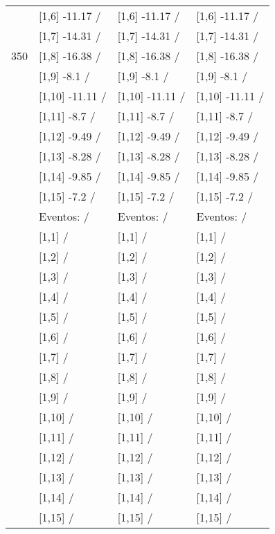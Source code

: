 \begin{table}
\begin{tabular}[t]{llll}
 & {}[1,6] -11.17  / & {}[1,6] -11.17  / & {}[1,6] -11.17  /\\
 & {}[1,7] -14.31  / & {}[1,7] -14.31  / & {}[1,7] -14.31  /\\
350 & {}[1,8] -16.38  / & {}[1,8] -16.38  / & {}[1,8] -16.38  /\\
\addlinespace
 & {}[1,9] -8.1  / & {}[1,9] -8.1  / & {}[1,9] -8.1  /\\
 & {}[1,10] -11.11  / & {}[1,10] -11.11  / & {}[1,10] -11.11  /\\
 & {}[1,11] -8.7  / & {}[1,11] -8.7  / & {}[1,11] -8.7  /\\
 & {}[1,12] -9.49  / & {}[1,12] -9.49  / & {}[1,12] -9.49  /\\
 & {}[1,13] -8.28  / & {}[1,13] -8.28  / & {}[1,13] -8.28  /\\
\addlinespace
 & {}[1,14] -9.85  / & {}[1,14] -9.85  / & {}[1,14] -9.85  /\\
 & {}[1,15] -7.2  / & {}[1,15] -7.2  / & {}[1,15] -7.2  /\\
 & Eventos:   / & Eventos:   / & Eventos:   /\\
 & {}[1,1]  / & {}[1,1]  / & {}[1,1]  /\\
 & {}[1,2]  / & {}[1,2]  / & {}[1,2]  /\\
\addlinespace
 & {}[1,3]  / & {}[1,3]  / & {}[1,3]  /\\
 & {}[1,4]  / & {}[1,4]  / & {}[1,4]  /\\
 & {}[1,5]  / & {}[1,5]  / & {}[1,5]  /\\
 & {}[1,6]  / & {}[1,6]  / & {}[1,6]  /\\
 & {}[1,7]  / & {}[1,7]  / & {}[1,7]  /\\
\addlinespace
500 & {}[1,8]  / & {}[1,8]  / & {}[1,8]  /\\
 & {}[1,9]  / & {}[1,9]  / & {}[1,9]  /\\
 & {}[1,10]  / & {}[1,10]  / & {}[1,10]  /\\
 & {}[1,11]  / & {}[1,11]  / & {}[1,11]  /\\
 & {}[1,12]  / & {}[1,12]  / & {}[1,12]  /\\
\addlinespace
 & {}[1,13]  / & {}[1,13]  / & {}[1,13]  /\\
 & {}[1,14]  / & {}[1,14]  / & {}[1,14]  /\\
 & {}[1,15]  / & {}[1,15]  / & {}[1,15]  /\\
\bottomrule
\end{tabular}
\end{table}
